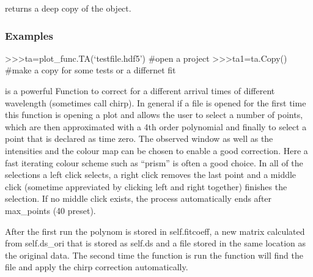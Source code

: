 \documentclass[letterpaper,10pt,english]{sphinxmanual}
\begin{document}
\begin{fulllineitems}

\begin{fulllineitems}
\label{\detokenize{plot_func:plot_func.TA.Copy}}
returns a deep copy of the object.
\subsubsection*{Examples}

\textgreater{}\textgreater{}\textgreater{}ta=plot\_func.TA(‘testfile.hdf5’) \#open a project
\textgreater{}\textgreater{}\textgreater{}ta1=ta.Copy() \#make a copy for some tests or a differnet fit

\end{fulllineitems}


\begin{fulllineitems}
\label{\detokenize{plot_func:plot_func.TA.Cor_Chirp}}
 is a powerful Function to correct for a different arrival times of
different wavelength (sometimes call chirp).
In general if a file is opened for the first time this function is opening
a plot and allows the user to select a number of points, which are then
approximated with a 4th order polynomial and finally to select a point
that is declared as time zero. The observed window as well as the intensities
and the colour map can be chosen to enable a good correction. Here a fast
iterating colour scheme such as “prism” is often a good choice. In all of the
selections a left click selects, a right click removes the last point and
a middle click (sometime appreviated by clicking left and right together)
finishes the selection. If no middle click exists, the process
automatically ends after max\_points (40 preset).

After the first run the polynom is stored in self.fitcoeff, a new matrix
calculated from self.ds\_ori that is stored as self.ds and a file stored in the
same location as the original data. The second time the function  is
run the function will find the file and apply the chirp correction automatically.


\end{fulllineitems}
\end{fulllineitems}
\end{document}
